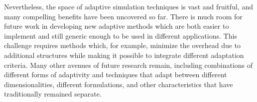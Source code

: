 Nevertheless, the space of adaptive simulation techniques is vast and fruitful, and many compelling benefits have been uncovered so far.
There is much room for future work in developing new adaptive methods which are both easier to implement and still generic enough to be used in different applications. This challenge requires methods which, for example, minimize the overhead due to additional structures while making it possible to integrate different adaptation criteria.
Many other avenues of future research remain, including combinations of different forms of adaptivity and techniques that adapt between different dimensionalities, different formulations, and other characteristics that have traditionally remained separate.
